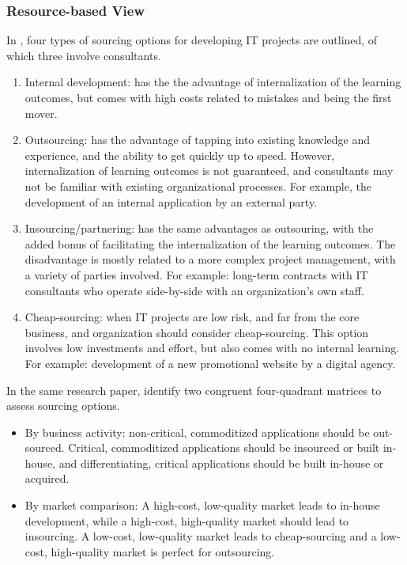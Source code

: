 \documentclass[12pt]{article}
\providecommand{\tightlist}{%
  \setlength{\itemsep}{0pt}\setlength{\parskip}{0pt}}
\begin{document}
\hypertarget{resource-based-view}{%
\subsubsection{Resource-based View}\label{resource-based-view}}

In \citet[177-180]{willcocks2003}, four types of sourcing options for
developing IT projects are outlined, of which three involve consultants.

\begin{enumerate}
\def\labelenumi{\arabic{enumi}.}
\tightlist
\item
  Internal development: has the the advantage of internalization of the
  learning outcomes, but comes with high costs related to mistakes and
  being the first mover.
\item
  Outsourcing: has the advantage of tapping into existing knowledge and
  experience, and the ability to get quickly up to speed. However,
  internalization of learning outcomes is not guaranteed, and
  consultants may not be familiar with existing organizational
  processes. For example, the development of an internal application by
  an external party.
\item
  Insourcing/partnering: has the same advantages as outsouring, with the
  added bonus of facilitating the internalization of the learning
  outcomes. The disadvantage is mostly related to a more complex project
  management, with a variety of parties involved. For example: long-term
  contracts with IT consultants who operate side-by-side with an
  organization's own staff.
\item
  Cheap-sourcing: when IT projects are low risk, and far from the core
  business, and organization should consider cheap-sourcing. This option
  involves low investments and effort, but also comes with no internal
  learning. For example: development of a new promotional website by a
  digital agency.
\end{enumerate}

In the same research paper, \citet[188-189]{willcocks2003} identify two
congruent four-quadrant matrices to assess sourcing options.

\begin{itemize}
\tightlist
\item
  By business activity: non-critical, commoditized applications should
  be out-sourced. Critical, commoditized applications should be
  insourced or built in-house, and differentiating, critical
  applications should be built in-house or acquired.
\item
  By market comparison: A high-cost, low-quality market leads to
  in-house development, while a high-cost, high-quality market should
  lead to insourcing. A low-cost, low-quality market leads to
  cheap-sourcing and a low-cost, high-quality market is perfect for
  outsourcing.
\end{itemize}
\end{document}
